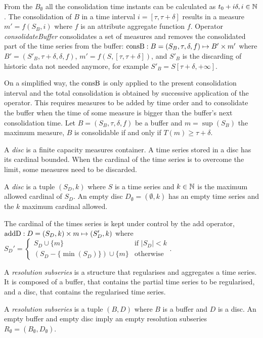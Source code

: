 From the $B_{\emptyset}$ all the consolidation time instants can be
calculated as $t_0+i\delta, i\in\mathbb{N}$. The consolidation of $B$ in a
time interval $i=[\tau,\tau+\delta]$ results in a measure
$m'=f(S_B,i)$ where $f$ is an attribute aggregate function
$f$. Operator \emph{consolidateBuffer} consolidates a set of measures
and removes the consolidated part of the time series from the buffer:
$\operatorname{consB} : B=(S_B,\tau,\delta,f) \mapsto B' \times m'$ where $ B'=
(S'_B,\tau+\delta,\delta,f)$, $m' = f(S,[\tau,\tau+\delta])$, and
$S'_B$ is the discarding of historic data not needed anymore, for example
$S'_B = S[\tau+\delta,+\infty]$.

On a simplified way, the $\operatorname{consB}$ is only applied to the present
consolidation interval and the total consolidation is obtained by
successive application of the operator. This requires measures to be
added by time order and to consolidate the buffer when the time of
some measure is bigger than the buffer's next consolidation time.  Let
$B=(S_B,\tau,\delta,f)$ be a buffer and $m=\sup(S_B)$ the maximum
measure, $B$ is consolidable if and only if $T(m) \geq
\tau+\delta$.




A \emph{disc} is a finite capacity measures container. A time series
stored in a disc has its cardinal bounded. When the cardinal of the
time series is to overcome the limit, some measures need to be
discarded.
\begin{definition}[Disc]
  A \emph{disc} is a tuple $(S_D,k)$ where $S$ is a time series and
  $k\in\mathbb{N}$ is the maximum allowed cardinal of $S_D$.  An empty
  disc $D_{\emptyset} = (\emptyset,k)$ has an empty time series and
  the $k$ maximum cardinal allowed.
\end{definition}

The cardinal of the times series is kept under control by the add
operator, $\operatorname{addD} : D=(S_D,k)\times m\mapsto (S'_D,k)$ where %
$
 S_D' = \begin{cases}
  S_D\cup\{m\}                 & \text{if } |S_D|<k  \\
  (S_D-\{\min(S_D)\}) \cup \{m\} & \text{otherwise}
\end{cases}  
$.


A \emph{resolution subseries} is a structure that regularises and
aggregates a time series. It is composed of a buffer, that contains
the partial time series to be regularised, and a disc, that contains
the regularised time series.
\begin{definition}
  A \emph{resolution subseries} is a tuple $(B,D)$ where $B$ is a
  buffer and $D$ is a disc.  An empty buffer and empty disc imply an
  empty resolution subseries $R_{\emptyset} =
  (B_{\emptyset},D_{\emptyset})$.
\end{definition}
 
